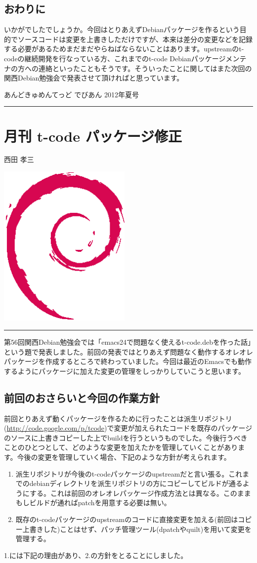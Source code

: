 \documentclass[mingoth,a4paper]{jsarticle}
\renewcommand{\dancersection}[2]{%
\newpage
あんどきゅめんてっど でびあん 2012年夏号
%
\vspace{0.1mm}\\
{\color{dancerdarkblue}\rule{\hsize}{2mm}}

%
%
\begin{minipage}[t]{0.6\hsize}
\color{dancerdarkblue}
\vspace{1cm}
\section{#1}
\hfill{}#2\\
\end{minipage}
\begin{minipage}[t]{0.4\hsize}
\vspace{-2cm}
\hfill{}\includegraphics[height=8cm]{image200502/openlogo-nd.eps}\\
\vspace{-5cm}
\end{minipage}
%
{\color{dancerlightblue}\rule{0.66\hsize}{2mm}}
%
\vspace{2cm}
}
\begin{document}
\subsection{おわりに}

いかがでしたでしょうか。今回はとりあえずDebianパッケージを作るという目的でソースコードは変更を上書きしただけですが、本来は差分の変更などを記録する必要があるためまだまだやらねばならないことはあります。upstreamのt-codeの継続開発を行なっている方、これまでのt-code Debianパッケージメンテナの方への連絡といったこともそうです。そういったことに関してはまた次回の関西Debian勉強会で発表させて頂ければと思っています。

\clearpage


\dancersection{月刊 t-code パッケージ修正}{西田 孝三}

第56回関西Debian勉強会では「emacs24で問題なく使えるt-code.debを作った話」という題で発表しました。前回の発表ではとりあえず問題なく動作するオレオレパッケージを作成するところで終わっていました。今回は最近のEmacsでも動作するようにパッケージに加えた変更の管理をしっかりしていこうと思います。

\subsection{前回のおさらいと今回の作業方針}
前回とりあえず動くパッケージを作るために行ったことは派生リポジトリ(\url{http://code.google.com/p/tcode})で変更が加えられたコードを既存のパッケージのソースに上書きコピーした上でbuildを行うというものでした。今後行うべきことのひとつとして、どのような変更を加えたかを管理していくことがあります。今後の変更を管理していく場合、下記のような方針が考えられます。

\begin{enumerate}
\item 派生リポジトリが今後のt-codeパッケージのupstreamだと言い張る。これまでのdebianディレクトリを派生リポジトリの方にコピーしてビルドが通るようにする。これは前回のオレオレパッケージ作成方法とは異なる。このままもしビルドが通ればpatchを用意する必要は無い。
\item 既存のt-codeパッケージのupstreamのコードに直接変更を加える(前回はコピー上書きした)ことはせず、パッチ管理ツール(dpatchやquilt)を用いて変更を管理する。
\end{enumerate}

1.には下記の理由があり、2.の方針をとることにしました。
\end{document}
